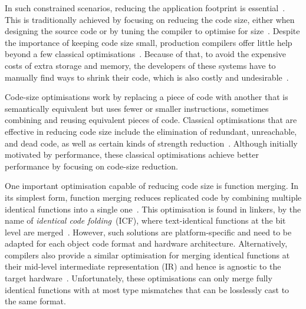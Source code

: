 In such constrained scenarios, reducing the application footprint is essential~\cite{schultz03,varma04,sehgal12,keoh14,auler17}.
This is traditionally achieved by focusing on reducing the code size, either when designing the source code or by tuning the compiler to optimise for size~\cite{fisher05,sehgal12,hennessy17,rocha19}.
Despite the importance of keeping code size small, production compilers offer little help beyond a few classical optimisations~\cite{cocke70,briggs97,debray00}.
Because of that, to avoid the expensive costs of extra storage and memory, the developers of these systems have to manually find ways to shrink their code, which is also costly and undesirable~\cite{keoh14,weaver09}.

Code-size optimisations work by replacing a piece of code with another that is semantically equivalent but uses fewer or smaller instructions, sometimes combining and reusing equivalent pieces of code.
Classical optimisations that are effective in reducing code size include the elimination of redundant, unreachable, and dead code, as well as certain kinds of strength reduction~\cite{cocke70,briggs97,debray00}.
Although initially motivated by performance, these classical optimisations achieve better performance by focusing on code-size reduction.

One important optimisation capable of reducing code size is function merging.
In its simplest form, function merging reduces replicated code by combining multiple identical functions into a single one~\cite{llvm-fm,livska14}.
This optimisation is found in linkers, by the name of \textit{identical code folding}~(ICF), where text-identical functions at the bit level are merged~\cite{tallam10,kwan12,msvc-icf}.
However, such solutions are platform-specific and need to be adapted for each object code format and hardware architecture.
Alternatively, compilers also provide a similar optimisation for merging identical functions at their mid-level intermediate representation (IR) and hence is agnostic to the target hardware~\cite{llvm-fm,livska14}.
Unfortunately, these optimisations can only merge fully identical functions with at most type mismatches that can be losslessly cast to the same format.

